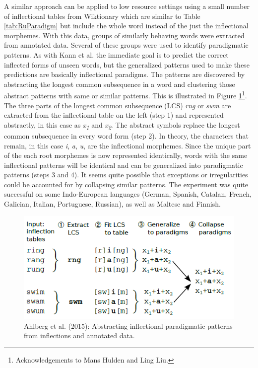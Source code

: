 \documentclass[12pt]{article}
\begin{document}
A similar approach can be applied to low resource settings \cite{ahlberg_semi-supervised_2014,ahlberg_paradigm_2015} using a small number of inflectional tables from Wiktionary which are similar to Table \ref{tab:RuParadigm} but include the whole word instead of the just the inflectional morphemes. With this data, groups of similarly behaving words were extracted from annotated data. Several of these groups were used to identify paradigmatic patterns.  As with Kann et al. the immediate goal is to predict the correct inflected forms of unseen words, but the generalized patterns used to make these predictions are basically inflectional paradigms. The patterns are discovered by abstracting the longest common subsequence in a word and clustering those abstract patterns with same or similar patterns. This is illustrated in Figure \ref{fig:LCS}\footnote{Acknowledgements to Mans Hulden and Ling Liu.}. The three parts of the longest common subsequence (LCS) \textit{rng} or \textit{swm} are extracted from the inflectional table on the left (step 1) and represented abstractly, in this case as \textit{x\textsubscript{1}} and \textit{x\textsubscript{2}}. The abstract symbols replace the longest common subsequence in every word form (step 2). In theory, the characters that remain, in this case \textit{i}, \textit{a}, \textit{u}, are the inflectional morphemes. Since the unique part of the each root morphemes is now represented identically, words with the same inflectional patterns will be identical and can be generalized into paradigmatic patterns (steps 3 and 4). It seems quite possible that exceptions or irregularities could be accounted for by collapsing similar patterns. The experiment was quite successful on some Indo-European languages (German, Spanish, Catalan, French, Galician, Italian, Portuguese, Russian), as well as Maltese and Finnish.

\begin{figure}[ht]
\label{fig:LCS}
\begin{center}
\includegraphics[width=0.7\columnwidth]{Ahlberg2015-LCS.PNG}
\caption{Ahlberg et al. (2015): Abstracting inflectional paradigmatic patterns from inflections and annotated data.}
\end{center}
\end{figure}
\end{document}
